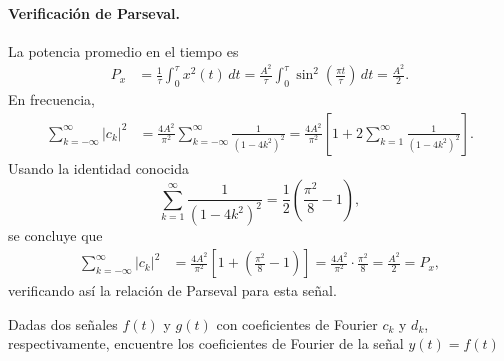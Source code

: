 \documentclass[
  11pt,
  letterpaper,
   addpoints,
   answers
  ]{exam}
\begin{document}
\begin{questions}
\begin{solution}
\paragraph{Verificación de Parseval.}
La potencia promedio en el tiempo es
\begin{align}
P_x &= \frac{1}{\tau}\int_{0}^{\tau}x^2(t)\,dt
= \frac{A^2}{\tau}\int_{0}^{\tau}\sin^2\!\left(\frac{\pi t}{\tau}\right)\,dt
= \frac{A^2}{2}.
\end{align}
En frecuencia,
\begin{align}
\sum_{k=-\infty}^{\infty}|c_k|^2
&= \frac{4A^2}{\pi^2}\sum_{k=-\infty}^{\infty}\frac{1}{(1-4k^2)^2}
= \frac{4A^2}{\pi^2}\left[1+2\sum_{k=1}^{\infty}\frac{1}{(1-4k^2)^2}\right].
\end{align}
Usando la identidad conocida
\begin{equation}
\sum_{k=1}^{\infty}\frac{1}{(1-4k^2)^2}=\frac{1}{2}\!\left(\frac{\pi^2}{8}-1\right),
\end{equation}
se concluye que
\begin{align}
\sum_{k=-\infty}^{\infty}|c_k|^2
&= \frac{4A^2}{\pi^2}\left[1+\left(\frac{\pi^2}{8}-1\right)\right]
= \frac{4A^2}{\pi^2}\cdot\frac{\pi^2}{8}
= \frac{A^2}{2}
= P_x,
\end{align}
verificando así la relación de Parseval para esta señal.
\end{solution}
\question Dadas dos señales $f(t)$ y $g(t)$ con coeficientes de Fourier $c_k$ y $d_k$, respectivamente, encuentre los coeficientes de Fourier de la señal $y(t) = f(t)$
\begin{solution}

\end{solution}
\end{questions}
\end{document}
